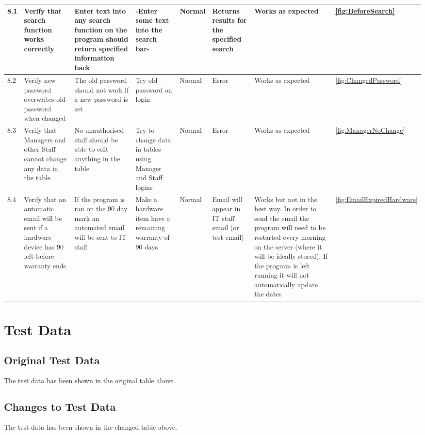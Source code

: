 \begin{landscape}
\begin{center}
\begin{longtable}{|p{1.5cm}|p{2cm}|p{2.5cm}|p{2cm}|p{2cm}|p{2cm}|p{3cm}|p{1.7cm}|}
8.1 & Verify that search function works correctly & Enter text into any search function on the program should return specified information back & -Enter some text into the search bar- & Normal & Returns results for the specified search &Works as expected&\ref {fig:BeforeSearch} \\ \hline
8.2 & Verify new password overwrites old password when changed & The old password should not work if a new password is set & Try old password on login & Normal & Error & Works as expected&\ref {fig:ChangedPassword} \\ \hline
8.3 & Verify that Managers and other Staff cannot change any data in the table & No unauthorised staff should be able to edit anything in the table & Try to change data in tables using Manager and Staff logins & Normal & Error &Works as expected&\ref {fig:ManagerNoChange} \\ \hline
\rowcolor{lightgray}8.4 & Verify that an automatic email will be sent if a hardware device has 90 left before warranty ends &If the program is ran on the 90 day mark an automated email will be sent to IT staff &Make a hardware item have a remaining warranty of 90 days &Normal&Email will appear in IT staff email (or test email) & Works but not in the best way. In order to send the email the program will need to be restarted every morning on the server (where it will be ideally stored). If the program is left running it will not automatically update the dates &\ref {fig:EmailExpiredHardware} \\ \hline



    \end{longtable}
\end{center}

\section{Test Data}

\subsection{Original Test Data}

The test data has been shown in the original table above.

\subsection{Changes to Test Data}

The test data has been shown in the changed table above.


\end{landscape}
